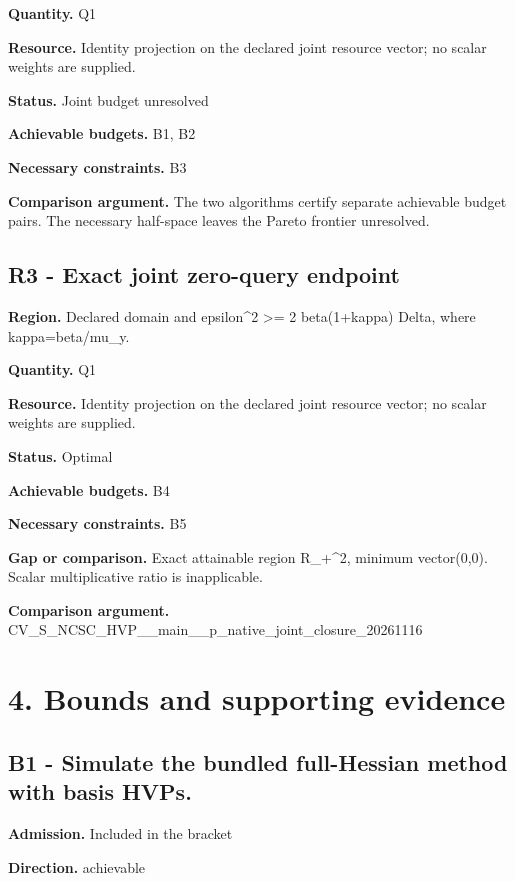 \documentclass[10pt,a4paper]{article}
\begin{document}
\textbf{Quantity.} Q1

\textbf{Resource.} Identity projection on the declared joint resource vector; no scalar weights are supplied.

\textbf{Status.} Joint budget unresolved

\textbf{Achievable budgets.} B1, B2

\textbf{Necessary constraints.} B3

\textbf{Comparison argument.} The two algorithms certify separate achievable budget pairs. The necessary half-space leaves the Pareto frontier unresolved.

\subsection{R3 - Exact joint zero-query endpoint}
\textbf{Region.} Declared domain and epsilon\textasciicircum{}2 >= 2 beta(1+kappa) Delta, where kappa=beta/mu\_\allowbreak{}y.

\textbf{Quantity.} Q1

\textbf{Resource.} Identity projection on the declared joint resource vector; no scalar weights are supplied.

\textbf{Status.} Optimal

\textbf{Achievable budgets.} B4

\textbf{Necessary constraints.} B5

\textbf{Gap or comparison.} Exact attainable region R\_\allowbreak{}+\textasciicircum{}2, minimum vector(0,0). Scalar multiplicative ratio is inapplicable.

\textbf{Comparison argument.} CV\_\allowbreak{}S\_\allowbreak{}NCSC\_\allowbreak{}HVP\_\allowbreak{}\_\allowbreak{}main\_\allowbreak{}\_\allowbreak{}p\_\allowbreak{}native\_\allowbreak{}joint\_\allowbreak{}closure\_\allowbreak{}20261116

\section{4. Bounds and supporting evidence}
\subsection{B1 - Simulate the bundled full-Hessian method with basis HVPs.}
\textbf{Admission.} Included in the bracket

\textbf{Direction.} achievable
\end{document}
